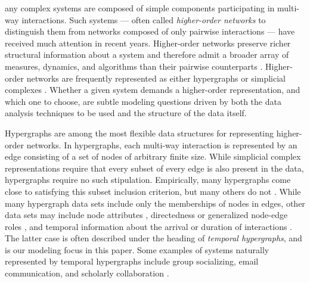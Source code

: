 any complex systems are composed of simple components participating in multi-way interactions. 
Such systems --- often called \emph{higher-order networks} \cite{bickWhatAreHigherOrder2023a} to distinguish them from networks composed of only pairwise interactions --- have received much attention in recent years. 
Higher-order networks preserve richer structural information about a system and therefore admit a broader array of measures, dynamics, and algorithms than their pairwise counterparts \cite{battistonNetworksPairwiseInteractions2020,battiston2021physics,pmlr-v97-chitra19a}. 
Higher-order networks are frequently represented as either hypergraphs or simplicial complexes \cite{bacciniWeightedSimplicialComplexes2022}. 
Whether a given system demands a higher-order representation, and which one to choose, are subtle modeling questions \cite{torresWhyHowWhen2021} driven by both the data analysis techniques to be used and the structure of the data itself. 


Hypergraphs are among the most flexible data structures for representing higher-order networks. 
In hypergraphs, each multi-way interaction is represented by an edge consisting of a set of nodes of arbitrary finite size. 
While simplicial complex representations require that every subset of every edge is also present in the data, hypergraphs require no such stipulation. 
Empirically, many hypergraphs come close to satisfying this subset inclusion criterion, but many others do not \cite{landrySimplicialityHigherorderNetworks2024}. 
While many hypergraph data sets include only the memberships of nodes in edges, other data sets may include node attributes \cite{badalyanHypergraphsNodeAttributes2023}, directedness or generalized node-edge roles \cite{gallo1993directed,chodrowAnnotatedHypergraphsModels2020}, and temporal information about the arrival or duration of interactions \cite{leeTHyMeTemporalHypergraph2021,myersTopologicalAnalysisTemporal2023}. 
The latter case is often described under the heading of \emph{temporal hypergraphs}, and is our modeling focus in this paper. 
Some examples of systems naturally represented by temporal hypergraphs include group socializing, email communication, and scholarly collaboration \cite{neuhauserConsensusDynamicsTemporal2021,sahasrabuddheModellingNonlinearConsensus2021,cencettiTemporalPropertiesHigherorder2021}.


